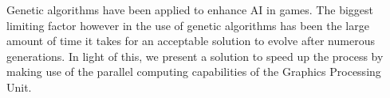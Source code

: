\begin{thesisabstract}
Genetic algorithms have been applied to enhance AI in games. The biggest
limiting factor however in the use of genetic algorithms has been the large amount of 
time it takes for an acceptable solution to evolve after numerous generations.
In light of this, we present a solution to speed up the process by making use of the
parallel computing capabilities of the Graphics Processing Unit.
\end{thesisabstract}